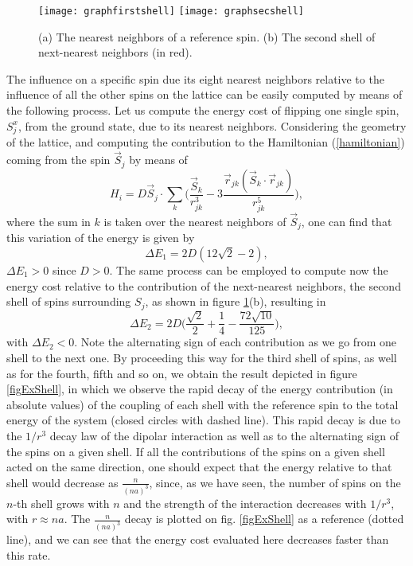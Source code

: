 \documentclass[aps,showkeys,groupedaddress]{revtex4}
\begin{document}
\begin{figure}[ht]
\begin{center}
\texttt{[image: graphfirstshell]} \texttt{[image: graphsecshell]}
\end{center}
\caption{(a) The nearest neighbors of a reference spin. (b) The second shell of next-nearest neighbors (in red).}
\label{shells}
\end{figure}

The influence on a specific spin due its eight nearest neighbors relative to the influence of all the other spins on the lattice can be easily computed by means of the following process. Let us compute the energy cost of flipping one single spin, $S^x_{j}$, from the ground state, due to its nearest neighbors. Considering the geometry of the lattice, and computing the contribution to the Hamiltonian (\ref{hamiltonian}) coming from the spin $\vec{S}_{j}$ by means of
\begin{equation}
H_i = D \vec{S}_j \cdot \sum_k \Big( \frac{\vec{S}_k}{r^3_{jk}} - 3 \frac{ \vec{r}_{jk} (\vec{S}_k \cdot \vec{r}_{jk})}{r^5_{jk}}\Big), 
\end{equation}
where the sum in $k$ is taken over the nearest neighbors of $\vec{S}_j$, one can find that this variation of the energy is given by
\begin{equation}
\Delta E_1 = 2D (12 \sqrt{2} - 2), \label{DE1}
\end{equation}
$\Delta E_1 > 0$ since $D > 0$. The same process can be employed to compute now the energy cost relative to the contribution of the next-nearest neighbors, the second shell of spins surrounding $S_{j}$, as shown in figure \ref{shells}(b), resulting in
\begin{equation}
\Delta E_2 = 2D \Big( {\frac{\sqrt{2}}{2}+\frac{1}{4} - \frac{72\sqrt{10}}{125}} \Big), \label{DE2}
\end{equation}
with $\Delta E_2 < 0$. Note the alternating sign of each contribution as we go from one shell to the next one. By proceeding this way for the third shell of spins, as well as for the fourth, fifth and so on, we obtain the result depicted in figure \ref{figExShell}, in which we observe the rapid decay of the energy contribution (in absolute values) of the coupling of each shell with the reference spin to the total energy of the system (closed circles with dashed line). This rapid decay is due to the $1/r^3$ decay law of the dipolar interaction as well as to the alternating sign of the spins on a given shell. If all the contributions of the spins on a given shell acted on the same direction, one should expect that the energy relative to that shell would decrease as $\frac{n}{(na)^3}$, since, as we have seen, the number of spins on the $n$-th shell grows with $n$ and the strength of the interaction decreases with $1/r^3$, with $r \approx na$. The $\frac{n}{(na)^3}$ decay is plotted on fig. \ref{figExShell} as a reference (dotted line), and we can see that the energy cost evaluated here decreases faster than this rate.
\end{document}
